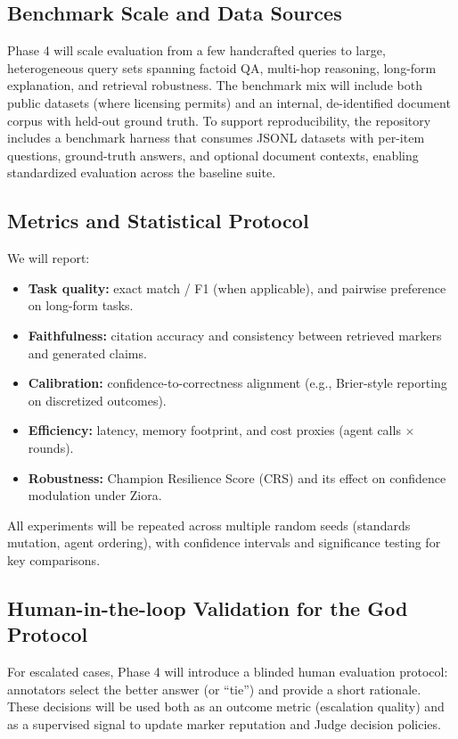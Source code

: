 \documentclass[11pt, a4paper]{article}
\begin{document}
\subsection{Benchmark Scale and Data Sources}
Phase 4 will scale evaluation from a few handcrafted queries to large, heterogeneous query sets spanning factoid QA, multi-hop reasoning, long-form explanation, and retrieval robustness. The benchmark mix will include both public datasets (where licensing permits) and an internal, de-identified document corpus with held-out ground truth.
To support reproducibility, the repository includes a benchmark harness that consumes JSONL datasets with per-item questions, ground-truth answers, and optional document contexts, enabling standardized evaluation across the baseline suite.

\subsection{Metrics and Statistical Protocol}
We will report:
\begin{itemize}
  \item \textbf{Task quality:} exact match / F1 (when applicable), and pairwise preference on long-form tasks.
  \item \textbf{Faithfulness:} citation accuracy and consistency between retrieved markers and generated claims.
  \item \textbf{Calibration:} confidence-to-correctness alignment (e.g., Brier-style reporting on discretized outcomes).
  \item \textbf{Efficiency:} latency, memory footprint, and cost proxies (agent calls $\times$ rounds).
  \item \textbf{Robustness:} Champion Resilience Score (CRS) and its effect on confidence modulation under Ziora.
\end{itemize}
All experiments will be repeated across multiple random seeds (standards mutation, agent ordering), with confidence intervals and significance testing for key comparisons.

\subsection{Human-in-the-loop Validation for the God Protocol}
For escalated cases, Phase 4 will introduce a blinded human evaluation protocol: annotators select the better answer (or ``tie'') and provide a short rationale. These decisions will be used both as an outcome metric (escalation quality) and as a supervised signal to update marker reputation and Judge decision policies.
\end{document}
